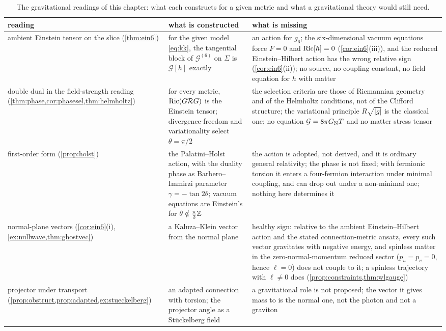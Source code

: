\begin{table}[t]
\centering
\small
\begin{tabular}{@{}>{\raggedright\arraybackslash}p{3.0cm}>{\raggedright\arraybackslash}p{5.2cm}>{\raggedright\arraybackslash}p{6.0cm}@{}}
\toprule
reading & what is constructed & what is missing\\
\midrule
ambient Einstein tensor on the slice (\cref{thm:ein6}) & for the given model \eqref{eq:kk}, the tangential block of $\mathcal G^{(6)}$ on $\Sigma$ is $\mathcal G[h]$ exactly &
an action for $g_6$; the six-dimensional vacuum equations force $F=0$ and $\operatorname{Ric}[h]=0$ (\cref{cor:ein6}(iii)), and the reduced Einstein--Hilbert action has the wrong
relative sign (\cref{cor:ein6}(ii)); no source, no coupling constant, no field equation for $h$ with matter\\
double dual in the field-strength reading (\cref{thm:phase,cor:phasesel,thm:helmholtz}) & for every metric, $\operatorname{Ric}(G\mathcal R G)$ is the Einstein tensor; divergence-freedom and
variationality select $\theta=\pi/2$ & the selection criteria are those of Riemannian geometry and of the Helmholtz conditions, not of the Clifford structure; the
variational principle $R\sqrt{|g|}$ is the classical one; no equation $\mathcal G=8\pi G_{\rm N}T$ and no matter stress tensor\\
first-order form (\cref{prop:holst}) & the Palatini--Holst action, with the duality phase as Barbero--Immirzi parameter $\gamma=-\tan2\theta$; vacuum equations
are Einstein's for $\theta\notin\tfrac\pi2\mathbb{Z}$ & the action is adopted, not derived, and it is ordinary general relativity; the phase is not fixed; with fermionic torsion it
enters a four-fermion interaction under minimal coupling, and can drop out under a non-minimal one; nothing here determines it\\
normal-plane vectors (\cref{cor:ein6}(i), \cref{ex:nullwave,thm:ghostvec}) & a Kaluza--Klein vector from the normal plane & healthy sign: relative to the ambient Einstein--Hilbert action and the stated connection-metric ansatz, every such vector
gravitates with negative energy, and spinless matter in the zero-normal-momentum reduced sector ($p_u=p_v=0$, hence $\ell=0$) does not couple to it; a spinless trajectory with $\ell\neq0$ does (\cref{prop:constraints,thm:wlgauge})\\
projector under transport (\cref{prop:obstruct,prop:adapted,ex:stueckelberg}) & an adapted connection with torsion; the projector angle as a St\"uckelberg field & a
gravitational role is not proposed; the vector it gives mass to is the normal one, not the photon and not a graviton\\
\bottomrule
\end{tabular}
\caption{The gravitational readings of this chapter: what each constructs for a given metric and what a gravitational theory would still need.}
\label{tab:gravlimits}
\end{table}

